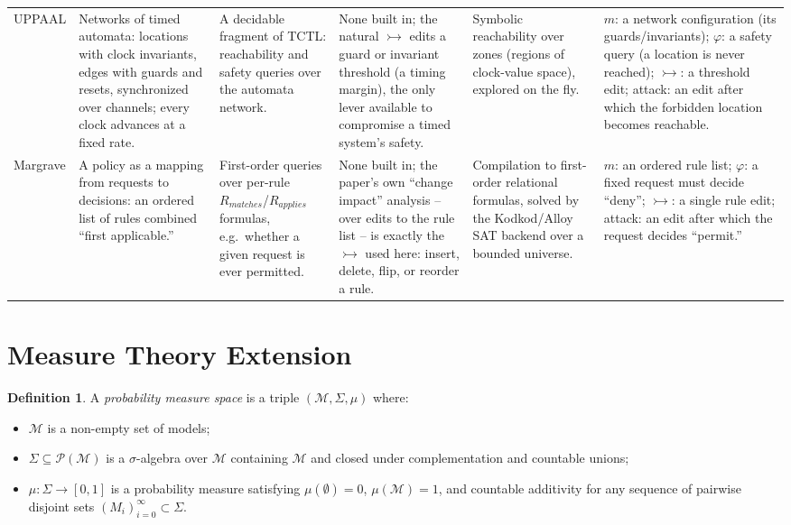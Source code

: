 \documentclass[11pt]{amsart}
\theoremstyle{definition}
\newtheorem{definition}{Definition}
\theoremstyle{remark}
\newcommand{\adv}{\rightarrowtail}   %
\newcommand{\M}{\mathcal{M}}
\begin{document}
\begin{landscape}
\begin{longtable}{L{1.7cm} L{4.0cm} L{3.5cm} L{4.2cm} L{4.4cm} L{3.6cm}}
\addlinespace
UPPAAL \cite{uppaal} &
Networks of timed automata: locations with clock invariants, edges with guards and resets,
synchronized over channels; every clock advances at a fixed rate. &
A decidable fragment of TCTL: reachability and safety queries over the automata network. &
None built in; the natural $\adv$ edits a guard or invariant threshold (a timing margin), the
only lever available to compromise a timed system's safety. &
Symbolic reachability over zones (regions of clock-value space), explored on the fly. &
$m$: a network configuration (its guards/invariants); $\varphi$: a safety query (a location is never
reached); $\adv$: a threshold edit; attack: an edit after which the forbidden location becomes reachable. \\
\addlinespace
Margrave \cite{margrave} &
A policy as a mapping from requests to decisions: an ordered list of rules combined ``first
applicable.'' &
First-order queries over per-rule $R_{\mathit{matches}}$/$R_{\mathit{applies}}$ formulas, e.g.\
whether a given request is ever permitted. &
None built in; the paper's own ``change impact'' analysis -- over edits to the rule list -- is
exactly the $\adv$ used here: insert, delete, flip, or reorder a rule. &
Compilation to first-order relational formulas, solved by the Kodkod/Alloy SAT backend over a
bounded universe. &
$m$: an ordered rule list; $\varphi$: a fixed request must decide ``deny''; $\adv$: a single rule edit;
attack: an edit after which the request decides ``permit.'' \\
\bottomrule
\end{longtable}
\endgroup
\end{landscape}

\section{Measure Theory Extension}

\begin{definition}
A \emph{probability measure space} is a triple $(\M, \Sigma, \mu)$ where:
\begin{itemize}
  \item $\M$ is a non-empty set of models;
  \item $\Sigma \subseteq \mathcal{P}(\M)$ is a $\sigma$-algebra over $\M$ containing $\M$ and closed under complementation and countable
  unions;
  \item $\mu : \Sigma \to [0, 1]$ is a probability measure satisfying $\mu(\emptyset) = 0$, $\mu(\M) = 1$, and countable additivity
  for any sequence of pairwise disjoint sets $(M_i)_{i=0}^{\infty} \subset \Sigma$.
\end{itemize}
\end{definition}
\end{document}
